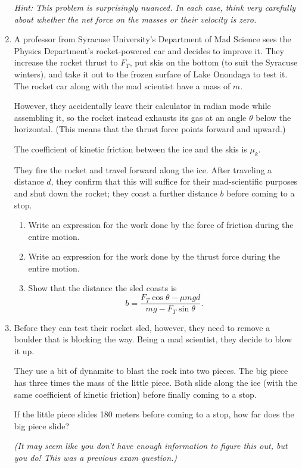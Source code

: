 \documentclass[12pt]{article}
\begin{document}
\begin{enumerate}
{\it Hint: This problem is surprisingly nuanced. In each case, think very carefully about whether the net \rm{force} on the masses \it or their \rm{velocity} \it is zero.}
 
 \bigskip
 
\item A professor from Syracuse University's Department of Mad Science sees the Physics Department's rocket-powered car and decides to improve it. They increase the rocket thrust to $F_T$, put skis on the bottom (to suit the Syracuse winters), and take it out to the frozen surface of Lake Onondaga to test it. The rocket car along with the mad scientist have a mass of $m$. 

However, they accidentally leave their calculator in radian mode while assembling it, so the rocket instead exhausts its gas at an angle $\theta$ below the horizontal. (This means that the thrust force points forward and upward.)

The coefficient of kinetic friction between the ice and the skis is $\mu_k$.

They fire the rocket and travel forward along the ice. After traveling a distance $d$, they confirm that this will suffice for their mad-scientific purposes and shut down the rocket; they coast a further distance $b$ before coming to a stop.

\begin{enumerate}
	\item Write an expression for the work done by the force of friction during the entire motion.
	\item Write an expression for the work done by the thrust force during the entire motion.
	\item Show that the distance the sled coasts is $$b=\frac{F_T \cos \theta - \mu mgd}{mg - F_T \sin \theta}.$$
\end{enumerate}

\bigskip

\item Before they can test their rocket sled, however, they need to remove a boulder that is blocking the way. Being a mad scientist, they decide to blow it up.

They use a bit of dynamite to blast the rock into two pieces. The big piece has three times the mass of the little piece. Both slide along the ice (with the same coefficient of kinetic friction) before finally coming to a stop.

If the little piece slides 180 meters before coming to a stop, how far does the big piece slide?

{\it (It may seem like you don't have enough information to figure this out, but you do! This was a previous exam question.)}

 

\end{enumerate}
\end{document}
